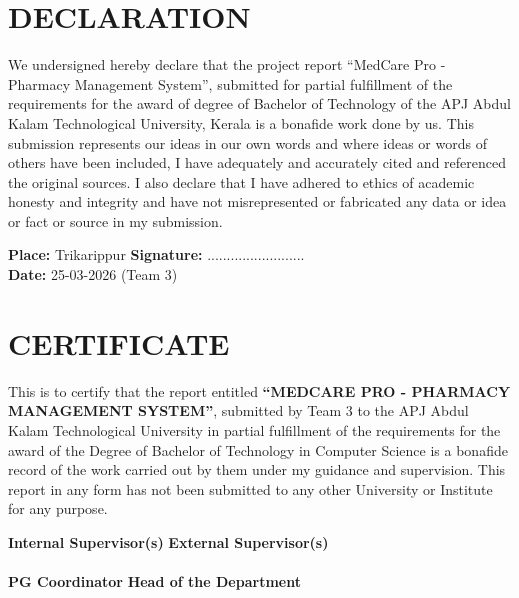 \documentclass[12pt, a4paper]{report}
\begin{document}
\chapter*{DECLARATION}
We undersigned hereby declare that the project report ``MedCare Pro - Pharmacy Management System'', submitted for partial fulfillment of the requirements for the award of degree of Bachelor of Technology of the APJ Abdul Kalam Technological University, Kerala is a bonafide work done by us. This submission represents our ideas in our own words and where ideas or words of others have been included, I have adequately and accurately cited and referenced the original sources. I also declare that I have adhered to ethics of academic honesty and integrity and have not misrepresented or fabricated any data or idea or fact or source in my submission. 

\vspace{3cm}
\noindent \textbf{Place:} Trikarippur \hfill \textbf{Signature:} ......................... \\
\textbf{Date:} 25-03-2026 \hfill (Team 3)

\clearpage

\chapter*{CERTIFICATE}
This is to certify that the report entitled \textbf{``MEDCARE PRO - PHARMACY MANAGEMENT SYSTEM''}, submitted by Team 3 to the APJ Abdul Kalam Technological University in partial fulfillment of the requirements for the award of the Degree of Bachelor of Technology in Computer Science is a bonafide record of the work carried out by them under my guidance and supervision. This report in any form has not been submitted to any other University or Institute for any purpose.

\vspace{4cm}
\noindent \textbf{Internal Supervisor(s)} \hfill \textbf{External Supervisor(s)} \\
\vspace{3cm} \\
\noindent \textbf{PG Coordinator} \hfill \textbf{Head of the Department} \\

\clearpage
\end{document}
